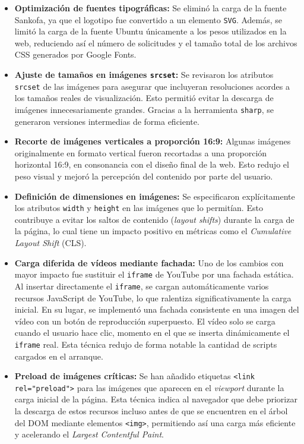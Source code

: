 \documentclass{article}
\begin{document}
\begin{itemize}
    \item \textbf{Optimización de fuentes tipográficas:} Se eliminó la carga de la fuente Sankofa, ya que el logotipo fue convertido a un elemento \texttt{SVG}. Además, se limitó la carga de la fuente Ubuntu únicamente a los pesos utilizados en la web, reduciendo así el número de solicitudes y el tamaño total de los archivos CSS generados por Google Fonts.
    
    \item \textbf{Ajuste de tamaños en imágenes \texttt{srcset}:} Se revisaron los atributos \texttt{srcset} de las imágenes para asegurar que incluyeran resoluciones acordes a los tamaños reales de visualización. Esto permitió evitar la descarga de imágenes innecesariamente grandes. Gracias a la herramienta \texttt{sharp}, se generaron versiones intermedias de forma eficiente.

    \item \textbf{Recorte de imágenes verticales a proporción 16:9:} Algunas imágenes originalmente en formato vertical fueron recortadas a una proporción horizontal 16:9, en consonancia con el diseño final de la web. Esto redujo el peso visual y mejoró la percepción del contenido por parte del usuario.

    \item \textbf{Definición de dimensiones en imágenes:} Se especificaron explícitamente los atributos \texttt{width} y \texttt{height} en las imágenes que lo permitían. Esto contribuye a evitar los saltos de contenido (\textit{layout shifts}) durante la carga de la página, lo cual tiene un impacto positivo en métricas como el \textit{Cumulative Layout Shift} (CLS).

    \item \textbf{Carga diferida de vídeos mediante fachada:} Uno de los cambios con mayor impacto fue sustituir el \texttt{iframe} de YouTube por una fachada estática. Al insertar directamente el \texttt{iframe}, se cargan automáticamente varios recursos JavaScript de YouTube, lo que ralentiza significativamente la carga inicial. En su lugar, se implementó una fachada consistente en una imagen del vídeo con un botón de reproducción superpuesto. El vídeo solo se carga cuando el usuario hace clic, momento en el que se inserta dinámicamente el \texttt{iframe} real. Esta técnica redujo de forma notable la cantidad de scripts cargados en el arranque.

    \item \textbf{Preload de imágenes críticas:} Se han añadido etiquetas \texttt{<link rel="preload">} para las imágenes que aparecen en el \textit{viewport} durante la carga inicial de la página. Esta técnica indica al navegador que debe priorizar la descarga de estos recursos incluso antes de que se encuentren en el árbol del DOM mediante elementos \texttt{<img>}, permitiendo así una carga más eficiente y acelerando el \textit{Largest Contentful Paint}.

\end{itemize}
\end{document}
